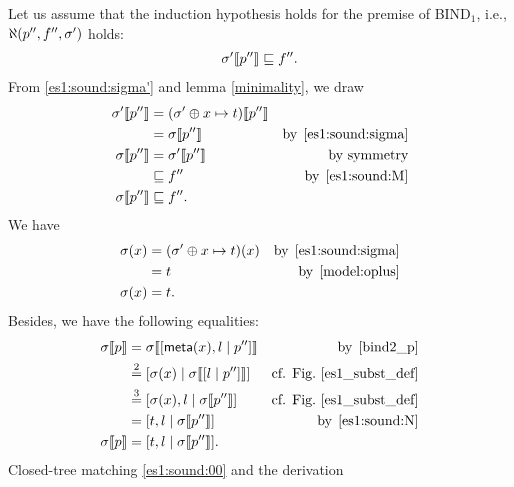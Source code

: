 \begin{enumerate}
\begin{enumerate}
      \end{enumerate}
      Let us assume that the induction hypothesis holds for the
      premise of \textsf{BIND}\(_1\), i.e., 
      \(\ind{U}(p'', f'', \sigma')\) holds:
      \begin{gather}
        \subst{p''}{\sigma'} \sqsubseteq f''. \label{es1:sound:M}
      \end{gather}
      From \ref{es1:sound:sigma'} and lemma \ref{minimality}, we draw
      \begin{align}
           \subst{p''}{\sigma'} 
        &= \subst{p''}{(\sigma' \oplus x \mapsto
             t)}\notag\\
        &= \subst{p''}{\sigma}
        &\text{by} \,\; \text{\ref{es1:sound:sigma}}\notag\\
           \subst{p''}{\sigma}
        &= \subst{p''}{\sigma'}
        &\text{by symmetry}\notag\\
        &\sqsubseteq f''
        &\text{by} \,\; \eqref{es1:sound:M}\notag\\
           \subst{p''}{\sigma}
        &\sqsubseteq f''. \label{es1:sound:00}
      \end{align}
      We have
      \begin{align}
           \sigma(x) 
        &= (\sigma' \oplus x \mapsto t)(x)
        &\text{by} \,\; \text{\ref{es1:sound:sigma}}\notag\\
        &= t
        &\text{by} \,\; \eqref{model:oplus}\notag\\
           \sigma(x) 
        &= t. \label{es1:sound:N}
      \end{align}
      Besides, we have the following equalities:
      \begin{align}
          \subst{p}{\sigma} 
        &= \subst{\cons{\meta{x},l}{p''}}{\sigma}
        &\text{by} \,\; \text{\ref{bind2_p}}\notag\\
        &\eqn{2}
          \cons{\sigma(x)}{\subst{\cons{l}{p''}}{\sigma}}
        &\text{cf. Fig.~\ref{es1_subst_def}}\notag\\
        &\eqn{3}
          \cons{\sigma(x),l}{\subst{p''}{\sigma}}
        &\text{cf. Fig.~\ref{es1_subst_def}}\notag\\
        &= \cons{t,l}{\subst{p''}{\sigma}}
        &\text{by} \,\; \eqref{es1:sound:N}\notag\\
          \subst{p}{\sigma} 
        &=
          \cons{t,l}{\subst{p''}{\sigma}}. \label{es1:sound:13}
      \end{align}
      Closed\hyp{}tree matching \eqref{es1:sound:00} and the derivation

\end{enumerate}
